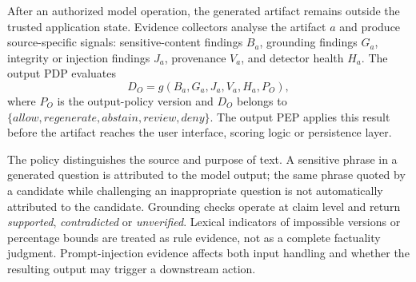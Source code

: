 \documentclass[conference]{IEEEtran}
\begin{document}
After an authorized model operation, the generated artifact remains outside the trusted application state. Evidence collectors analyse the artifact $a$ and produce source-specific signals: sensitive-content findings $B_a$, grounding findings $G_a$, integrity or injection findings $J_a$, provenance $V_a$, and detector health $H_a$. The output PDP evaluates
\begin{equation}
D_{O}=g(B_a,G_a,J_a,V_a,H_a,P_O),
\end{equation}
where $P_O$ is the output-policy version and $D_O$ belongs to $\{\textit{allow},\textit{regenerate},\textit{abstain},\textit{review},\textit{deny}\}$. The output PEP applies this result before the artifact reaches the user interface, scoring logic or persistence layer.

The policy distinguishes the source and purpose of text. A sensitive phrase in a generated question is attributed to the model output; the same phrase quoted by a candidate while challenging an inappropriate question is not automatically attributed to the candidate. Grounding checks operate at claim level and return \emph{supported}, \emph{contradicted} or \emph{unverified}. Lexical indicators of impossible versions or percentage bounds are treated as rule evidence, not as a complete factuality judgment. Prompt-injection evidence affects both input handling and whether the resulting output may trigger a downstream action.
\end{document}
